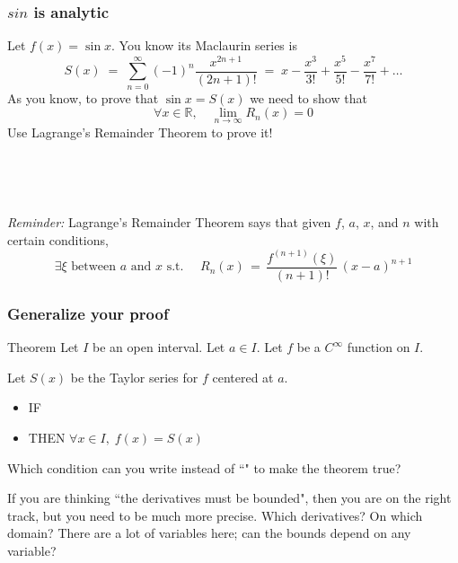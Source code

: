 \documentclass[14pt]{beamer}
\newcommand {\DS} [1] {${\displaystyle #1}$}
\newcommand {\R}{\mathbb{R}}
\newcommand{\p}{\pause}
\newcommand{\setsize}[1]{\fontsize{#1}{#1}\selectfont} %
\newcommand{\smallerfont}{\setsize{13}} %
\newcommand{\vvv}{\vspace{.2cm}}
\begin{document}
\begin{frame}
\smallerfont
\frametitle{$sin$ is analytic}

Let \DS{f(x) = \sin x}.  You know its Maclaurin series is
	$$
		S(x) \; =\;  \sum_{n=0}^{\infty} (-1)^n \frac{x^{2n+1}}{(2n+1)!}
			\; = \; x - \frac{x^3}{3!} + \frac{x^5}{5!} - \frac{x^7}{7!} + \ldots
	$$
As you know, to prove that \DS{\sin x = S(x)} we need to show that
	$$
		\forall x \in \R, \quad \lim_{n \to \infty} R_n(x) = 0
	$$
Use Lagrange's Remainder Theorem to prove it!

\

\hrulefill \p

\

\emph{Reminder:}  Lagrange's Remainder Theorem says that given $f$, $a$, $x$, and $n$ with certain conditions, 
	\begin{equation*}
		\exists \xi \mbox{ between $a$ and $x$ s.t. } \quad R_{n}(x) \, = \, \frac{f^{(n+1)}(\xi)}{(n+1)!} \, (x-a)^{n+1}
	\end{equation*}
\end{frame}
\begin{frame}[t]
\smallerfont
\frametitle{Generalize your proof}

\begin{block}{Theorem}
Let $I$ be an open interval.  Let $a \in I$.
Let $f$ be a $C^{\infty}$ function on $I$.

Let $S(x)$ be the Taylor series for $f$ centered at $a$.

\begin{itemize}
	\item  IF 
	\item  THEN \DS{\forall x \in I, \; f(x) = S(x)}
\end{itemize}

\end{block}
\vvv

Which condition can you write instead of  ``" to make the theorem true?

\p \vvv

If you are thinking ``the derivatives must be bounded", then you are on the right track, but you need to be much more precise.  Which derivatives?  On which domain?   There are a lot of variables here; can the bounds depend on any variable?  

\end{frame}
\end{document}
